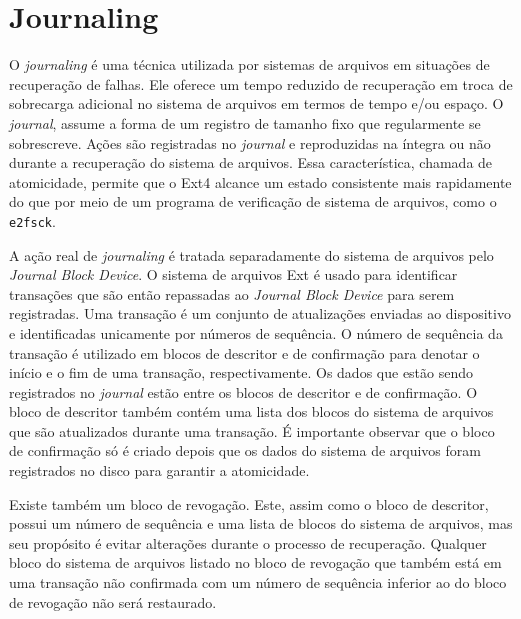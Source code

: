 \documentclass[
	12pt,				%
	openright,			%
	oneside,			%
	a4paper,			%
	chapter=TITLE,		%
	english,			%
	french,				%
	spanish,			%
	brazil				%
	]{abntex2}
\theoremstyle{definition}
\begin{document}

\section{Journaling}\label{sec:journaling}

O \textit{journaling} é uma técnica utilizada por sistemas de arquivos em situações de 
recuperação de falhas. Ele oferece um tempo reduzido de recuperação em troca de sobrecarga 
adicional no sistema de arquivos em termos de tempo e/ou espaço. O \textit{journal}, 
assume a forma de um registro de tamanho fixo que regularmente se sobrescreve. Ações são 
registradas no \textit{journal} e reproduzidas na íntegra ou não durante a recuperação do 
sistema de arquivos. Essa característica, chamada de atomicidade, permite que o Ext4 alcance 
um estado consistente mais rapidamente do que por meio de um programa de verificação de sistema 
de arquivos, como o \texttt{e2fsck}.

A ação real de \textit{journaling} é tratada separadamente do sistema de arquivos 
pelo \textit{Journal Block Device}. O sistema de arquivos Ext é usado para identificar 
transações que são então repassadas ao \textit{Journal Block Device} para serem registradas. 
Uma transação é um conjunto de atualizações enviadas ao dispositivo e identificadas unicamente 
por números de sequência. O número de sequência da transação é utilizado em blocos de descritor 
e de confirmação para denotar o início e o fim de uma transação, respectivamente. Os dados que 
estão sendo registrados no \textit{journal} estão entre os blocos de descritor e de confirmação. 
O bloco de descritor também contém uma lista dos blocos do sistema de arquivos que são atualizados 
durante uma transação. É importante observar que o bloco de confirmação só é criado depois 
que os dados do sistema de arquivos foram registrados no disco para garantir a atomicidade.

Existe também um bloco de revogação. Este, assim como o bloco de descritor, possui um 
número de sequência e uma lista de blocos do sistema de arquivos, mas seu propósito é 
evitar alterações durante o processo de recuperação. Qualquer bloco do sistema de arquivos 
listado no bloco de revogação que também está em uma transação não confirmada com um número 
de sequência inferior ao do bloco de revogação não será restaurado.
\end{document}
